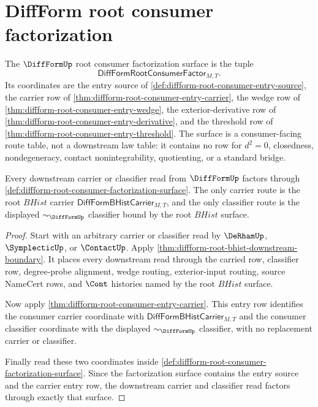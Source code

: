 \section{DiffForm root consumer factorization}
\label{sec:diffform-root-consumer-factorization}

\begin{definition}
\label{def:diffform-root-consumer-factorization-surface}
The $\DiffFormUp$ root consumer factorization surface is the tuple
$$
\mathsf{DiffFormRootConsumerFactor}_{M,T}.
$$
Its coordinates are the entry source of
\autoref{def:diffform-root-consumer-entry-source}, the carrier row of
\autoref{thm:diffform-root-consumer-entry-carrier}, the wedge row of
\autoref{thm:diffform-root-consumer-entry-wedge}, the exterior-derivative
row of \autoref{thm:diffform-root-consumer-entry-derivative}, and the
threshold row of \autoref{thm:diffform-root-consumer-entry-threshold}. The
surface is a consumer-facing route table, not a downstream law table: it
contains no row for $d^2=0$, closedness, nondegeneracy, contact
nonintegrability, quotienting, or a standard bridge.
\end{definition}

\begin{theorem}
\label{thm:diffform-root-consumer-factorization-carrier}
Every downstream carrier or classifier read from $\DiffFormUp$ factors
through \autoref{def:diffform-root-consumer-factorization-surface}. The only
carrier route is the root $BHist$ carrier
$\mathsf{DiffFormBHistCarrier}_{M,T}$, and the only classifier route is the
displayed $\sim_{\DiffFormUp}$ classifier bound by the root $BHist$ surface.
\end{theorem}
\begin{proof}
Start with an arbitrary carrier or classifier read by $\DeRhamUp$,
$\SymplecticUp$, or $\ContactUp$. Apply
\autoref{thm:diffform-root-bhist-downstream-boundary}. It places every
downstream read through the carried row, classifier row, degree-probe
alignment, wedge routing, exterior-input routing, source NameCert rows, and
$\Cont$ histories named by the root $BHist$ surface.

Now apply \autoref{thm:diffform-root-consumer-entry-carrier}. This entry row
identifies the consumer carrier coordinate with
$\mathsf{DiffFormBHistCarrier}_{M,T}$ and the consumer classifier coordinate
with the displayed $\sim_{\DiffFormUp}$ classifier, with no replacement
carrier or classifier.

Finally read these two coordinates inside
\autoref{def:diffform-root-consumer-factorization-surface}. Since the
factorization surface contains the entry source and the carrier entry row,
the downstream carrier and classifier read factors through exactly that
surface.
\end{proof}

